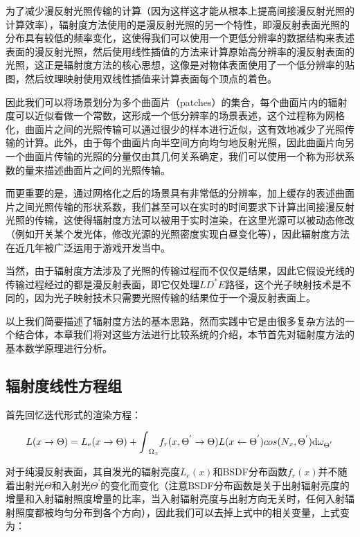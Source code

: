 为了减少漫反射光照传输的计算（因为这样这才能从根本上提高间接漫反射光照的计算效率），辐射度方法使用的是漫反射光照的另一个特性，即漫反射表面光照的分布具有较低的频率变化，这使得我们可以使用一个更低分辨率的数据结构来表述表面的漫反射光照，然后使用线性插值的方法来计算原始高分辨率的漫反射表面的光照，这正是辐射度方法的核心思想，这像是对物体表面使用了一个低分辨率的贴图，然后纹理映射使用双线性插值来计算表面每个顶点的着色。

因此我们可以将场景划分为多个曲面片（patches）的集合，每个曲面片内的辐射度可以近似看做一个常数，这形成一个低分辨率的场景表述，这个过程称为网格化，曲面片之间的光照传输可以通过很少的样本进行近似，这有效地减少了光照传输的计算。此外，由于每个曲面片向半空间方向均匀地反射光照，因此曲面片向另一个曲面片传输的光照的分量仅由其几何关系确定，我们可以使用一个称为形状系数的量来描述曲面片之间的光照传输。

而更重要的是，通过网格化之后的场景具有非常低的分辨率，加上缓存的表述曲面片之间光照传输的形状系数，我们甚至可以在实时的时间要求下计算出间接漫反射光照的传输，这使得辐射度方法可以被用于实时渲染，在这里光源可以被动态修改（例如开关某个发光体，修改光源的光照密度实现白昼变化等），因此辐射度方法在近几年被广泛运用于游戏开发当中。

当然，由于辐射度方法涉及了光照的传输过程而不仅仅是结果，因此它假设光线的传输过程经过的都是漫反射表面，即它仅处理$LD^{*}E$路径，这个光子映射技术是不同的，因为光子映射技术只需要光照传输的结果位于一个漫反射表面上。

以上我们简要描述了辐射度方法的基本思路，然而实践中它是由很多复杂方法的一个结合体，本章我们将对这些方法进行比较系统的介绍，本节首先对辐射度方法的基本数学原理进行分析。





\subsection{辐射度线性方程组}
首先回忆迭代形式的渲染方程：

\begin{equation}
	L(x\to\Theta)=L_e(x\to\Theta)+{\rm \int}_{\Omega_x}f_r(x,\Theta^{'}\to\Theta)L(x\leftarrow\Theta^{'})cos(N_x,\Theta^{'}){\rm d}\omega_{\Theta^{'}}
\end{equation}

\noindent 对于纯漫反射表面，其自发光的辐射亮度$L_e(x)$和BSDF分布函数$f_r(x)$并不随着出射光$\Theta$和入射光$\Theta^{'}$的变化而变化（注意BSDF分布函数是关于出射辐射亮度的增量和入射辐射照度增量的比率，当入射辐射亮度与出射方向无关时，任何入射辐射照度都被均匀分布到各个方向），因此我们可以去掉上式中的相关变量，上式变为：

